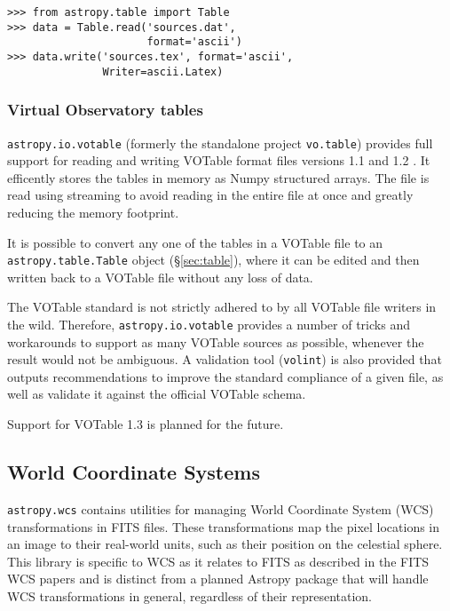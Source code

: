 \documentclass[traditabstract]{aa}
\begin{document}
\begin{verbatim}
>>> from astropy.table import Table
>>> data = Table.read('sources.dat',
                      format='ascii')
>>> data.write('sources.tex', format='ascii',
               Writer=ascii.Latex)
\end{verbatim}

\subsubsection{Virtual Observatory tables}

\texttt{astropy.io.votable} (formerly the standalone project
\texttt{vo.table}) provides full support for reading and writing
VOTable format files versions 1.1 and 1.2
\citep{ochsenbein2004votable,ochsenbein2009votable}.  It efficently
stores the tables in memory as Numpy structured arrays.  The file is
read using streaming to avoid reading in the entire file at once and
greatly reducing the memory footprint.

It is possible to convert any one of the tables in a VOTable file to
an \texttt{astropy.table.Table} object (\S\ref{sec:table}), where it
can be edited and then written back to a VOTable file without any loss
of data.

The VOTable standard is not strictly adhered to by all VOTable file
writers in the wild.  Therefore, \texttt{astropy.io.votable} provides
a number of tricks and workarounds to support as many VOTable sources
as possible, whenever the result would not be ambiguous.  A validation
tool (\texttt{volint}) is also provided that outputs recommendations
to improve the standard compliance of a given file, as well as
validate it against the official VOTable schema.

Support for VOTable 1.3 is planned for the future.

\subsection{World Coordinate Systems}

\label{sec:wcs}


\texttt{astropy.wcs} contains utilities for managing World Coordinate
System (WCS) transformations in FITS files.  These transformations map
the pixel locations in an image to their real-world units, such as
their position on the celestial sphere.  This library is specific to
WCS as it relates to FITS as described in the FITS WCS papers
\citep{greisen2002wcs,calabretta2002wcs,greisen2006wcs} and is
distinct from a planned Astropy package that will handle WCS
transformations in general, regardless of their representation.
\end{document}
